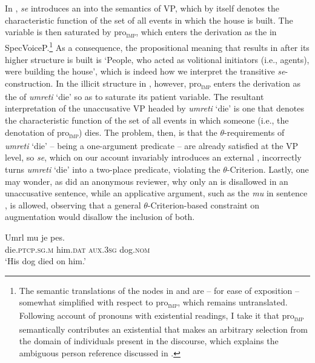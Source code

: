 \documentclass[output=paper,nonflat,newtxmath]{langsci/langscibook}
\begin{document}
\noindent In , \textit{se} introduces an  into the semantics of VP, which by itself denotes the characteristic function of the set of all events in which the house is built. The variable is then saturated by pro\textsubscript{\textsc{imp}}, which enters the derivation as the  in SpecVoiceP.\footnote{The semantic translations of the nodes in  and  are -- for ease of exposition -- somewhat simplified with respect to pro\textsubscript{\textsc{imp}}, which remains untranslated. Following  account of  pronouns with existential readings, I take it that pro\textsubscript{\textsc{imp}} semantically contributes an existential  that makes an arbitrary selection from the domain of individuals present in the discourse, which explains the ambiguous person reference discussed in .}  As a consequence, the propositional meaning that  results in after its higher structure is built is `People, who acted as volitional initiators (i.e., agents), were building the house', which is indeed how we interpret the  transitive  \textit{se}-construction. In the illicit structure in , however, pro\textsubscript{\textsc{imp}} enters the derivation as the  of \textit{umreti} `die' so as to saturate its patient variable. The resultant interpretation of the unaccusative VP headed by \textit{umreti} `die' is one that denotes the characteristic function of the set of all events in which someone (i.e., the denotation of pro\textsubscript{\textsc{imp}}) dies. The problem, then, is that the $\theta$-requirements of \textit{umreti} `die' – being a one-argument predicate – are already satisfied at the VP level, so \textit{se}, which on our account invariably introduces an external , incorrectly turns \textit{umreti} `die' into a two-place predicate, violating the $\theta$-Criterion.
Lastly, one may wonder, as did an anonymous reviewer,  why only an  is disallowed in an unaccusative sentence, while an applicative argument, such as the   \textit{mu} in sentence , is allowed, observing that a general  $\theta$-Criterion-based constraint on  augmentation would disallow the inclusion of both.

\begin{exe}
\ex \label{ummu} \gll Umrl mu je pes.\\
die.\textsc{ptcp.sg.m} him.\textsc{dat} \textsc{aux}.\textsc{3sg} dog.\textsc{nom}\\
\trans `His dog died on him.'
\end{exe}
\end{document}
